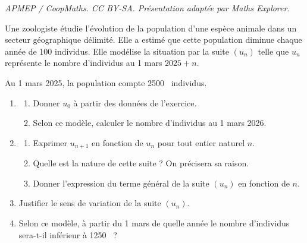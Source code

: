 \documentclass[10pt]{article}
\providecommand{\np}[2][]{{#2~#1}}
\begin{document}
\noindent\textit{APMEP / CoopMaths. CC BY-SA. Présentation adaptée par Maths Explorer.}\par\medskip
Une zoologiste étudie l'évolution de la population d'une espèce animale dans un secteur géographique délimité. Elle a estimé que cette population diminue chaque année de 100 individus. Elle modélise la situation par la suite $\left(u_n\right)$ telle que $u_n$ représente le nombre d'individus au 1 mars $2025+n$.

Au 1 mars 2025, la population compte \np{2500} individus.

\begin{enumerate}
	\item
	\begin{enumerate}
		\item Donner $u_0$ à partir des données de l'exercice.
		\item Selon ce modèle, calculer le nombre d'individus au 1 mars 2026.
	\end{enumerate}

	\item
	\begin{enumerate}
		\item Exprimer $u_{n+1}$ en fonction de $u_n$ pour tout entier naturel $n$.
		\item Quelle est la nature de cette suite ? On précisera sa raison.
		\item Donner l'expression du terme général de la suite $\left(u_n\right)$ en fonction de $n$.
	\end{enumerate}

	\item Justifier le sens de variation de la suite $\left(u_n\right)$.
	\item Selon ce modèle, à partir du 1 mars de quelle année le nombre d'individus sera-t-il inférieur à \np{1250} ?
\end{enumerate}

\medskip
\end{document}

